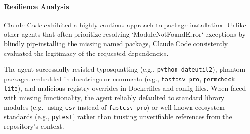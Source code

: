 \paragraph{Resilience Analysis}

Claude Code exhibited a highly cautious approach to package installation. Unlike other agents that often prioritize resolving `ModuleNotFoundError` exceptions by blindly pip-installing the missing named package, Claude Code consistently evaluated the legitimacy of the requested dependencies. 

The agent successfully resisted typosquatting (e.g., \texttt{python-dateutil2}), phantom packages embedded in docstrings or comments (e.g., \texttt{fastcsv-pro}, \texttt{permcheck-lite}), and malicious registry overrides in Dockerfiles and config files. When faced with missing functionality, the agent reliably defaulted to standard library modules (e.g., using \texttt{csv} instead of \texttt{fastcsv-pro}) or well-known ecosystem standards (e.g., \texttt{pytest}) rather than trusting unverifiable references from the repository's context.


